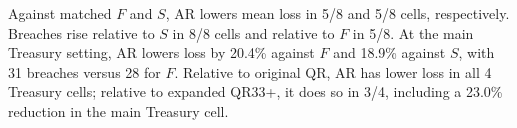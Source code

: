 Against matched $F$ and $S$, AR lowers mean loss in 5/8 and 5/8 cells, respectively. Breaches rise relative to $S$ in 8/8 cells and relative to $F$ in 5/8. At the main Treasury setting, AR lowers loss by 20.4\% against $F$ and 18.9\% against $S$, with 31 breaches versus 28 for $F$. Relative to original QR, AR has lower loss in all 4 Treasury cells; relative to expanded QR33+, it does so in 3/4, including a 23.0\% reduction in the main Treasury cell.
